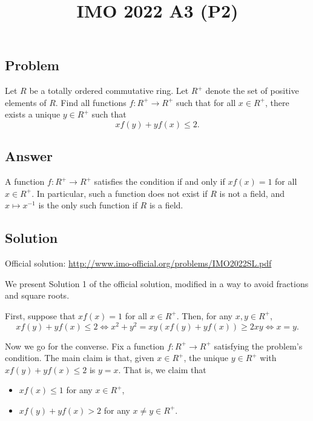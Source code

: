 \documentclass{article}
\title{IMO 2022 A3 (P2)}
\author{}
\date{}
\begin{document}
\maketitle



\subsection*{Problem}

Let $R$ be a totally ordered commutative ring.
Let $R^+$ denote the set of positive elements of $R$.
Find all functions $f : R^+ \to R^+$ such that for all $x \in R^+$, there exists a unique $y \in R^+$ such that
\[ x f(y) + y f(x) \leq 2. \]



\subsection*{Answer}

A function $f : R^+ \to R^+$ satisfies the condition if and only if $x f(x) = 1$ for all $x \in R^+$.
In particular, such a function does not exist if $R$ is not a field, and $x \mapsto x^{-1}$ is the only such function if $R$ is a field.



\subsection*{Solution}

Official solution: \url{http://www.imo-official.org/problems/IMO2022SL.pdf}

We present Solution 1 of the official solution, modified in a way to avoid fractions and square roots.

First, suppose that $x f(x) = 1$ for all $x \in R^+$.
Then, for any $x, y \in R^+$,
\[ x f(y) + y f(x) \leq 2 \iff x^2 + y^2 = xy(x f(y) + y f(x)) \geq 2xy \iff x = y. \]

Now we go for the converse.
Fix a function $f : R^+ \to R^+$ satisfying the problem's condition.
The main claim is that, given $x \in R^+$, the unique $y \in R^+$ with $x f(y) + y f(x) \leq 2$ is $y = x$.
That is, we claim that
\begin{itemize}
    \item   $x f(x) \leq 1$ for any $x \in R^+$,
    \item   $x f(y) + y f(x) > 2$ for any $x \neq y \in R^+$.
\end{itemize}
\end{document}
